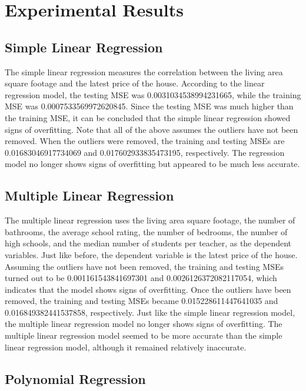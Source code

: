 \documentclass[12pt]{article}
\begin{document}
	\section{Experimental Results}
	
	\subsection{Simple Linear Regression}
	
	The simple linear regression measures the correlation between the living area square footage and the latest price of the house. According to the linear regression model, the testing MSE was 0.0031034538994231665, while the training MSE was 0.0007533569972620845. Since the testing MSE was much higher than the training MSE, it can be concluded that the simple linear regression showed signs of overfitting. Note that all of the above assumes the outliers have not been removed. When the outliers were removed, the training and testing MSEs are 0.01683046917734069 and 0.017602933835473195, respectively. The regression model no longer shows signs of overfitting but appeared to be much less accurate.
	
	
	\subsection{Multiple Linear Regression}
	
	The multiple linear regression uses the living area square footage, the number of bathrooms, the average school rating, the number of bedrooms, the number of high schools, and the median number of students per teacher, as the dependent variables. Just like before, the dependent variable is the latest price of the house. Assuming the outliers have not been removed, the training and testing MSEs turned out to be 0.001161543841697301 and 0.0026126372082117054, which indicates that the model shows signs of overfitting. Once the outliers have been removed, the training and testing MSEs became 0.015228611447641035 and 0.016849382441537858, respectively. Just like the simple linear regression model, the multiple linear regression model no longer shows signs of overfitting. The multiple linear regression model seemed to be more accurate than the simple linear regression model, although it remained relatively inaccurate.
	
	\subsection{Polynomial Regression}
	
\end{document}
